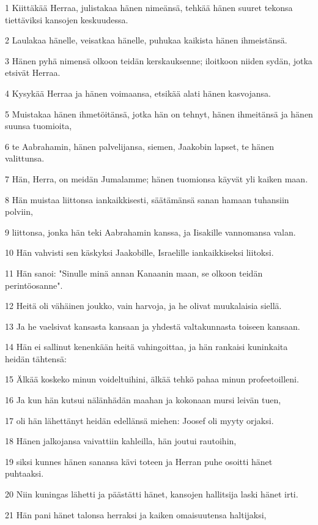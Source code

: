 \par 1 Kiittäkää Herraa, julistakaa hänen nimeänsä, tehkää hänen suuret tekonsa tiettäviksi kansojen keskuudessa.
\par 2 Laulakaa hänelle, veisatkaa hänelle, puhukaa kaikista hänen ihmeistänsä.
\par 3 Hänen pyhä nimensä olkoon teidän kerskauksenne; iloitkoon niiden sydän, jotka etsivät Herraa.
\par 4 Kysykää Herraa ja hänen voimaansa, etsikää alati hänen kasvojansa.
\par 5 Muistakaa hänen ihmetöitänsä, jotka hän on tehnyt, hänen ihmeitänsä ja hänen suunsa tuomioita,
\par 6 te Aabrahamin, hänen palvelijansa, siemen, Jaakobin lapset, te hänen valittunsa.
\par 7 Hän, Herra, on meidän Jumalamme; hänen tuomionsa käyvät yli kaiken maan.
\par 8 Hän muistaa liittonsa iankaikkisesti, säätämänsä sanan hamaan tuhansiin polviin,
\par 9 liittonsa, jonka hän teki Aabrahamin kanssa, ja Iisakille vannomansa valan.
\par 10 Hän vahvisti sen käskyksi Jaakobille, Israelille iankaikkiseksi liitoksi.
\par 11 Hän sanoi: "Sinulle minä annan Kanaanin maan, se olkoon teidän perintöosanne".
\par 12 Heitä oli vähäinen joukko, vain harvoja, ja he olivat muukalaisia siellä.
\par 13 Ja he vaelsivat kansasta kansaan ja yhdestä valtakunnasta toiseen kansaan.
\par 14 Hän ei sallinut kenenkään heitä vahingoittaa, ja hän rankaisi kuninkaita heidän tähtensä:
\par 15 Älkää koskeko minun voideltuihini, älkää tehkö pahaa minun profeetoilleni.
\par 16 Ja kun hän kutsui nälänhädän maahan ja kokonaan mursi leivän tuen,
\par 17 oli hän lähettänyt heidän edellänsä miehen: Joosef oli myyty orjaksi.
\par 18 Hänen jalkojansa vaivattiin kahleilla, hän joutui rautoihin,
\par 19 siksi kunnes hänen sanansa kävi toteen ja Herran puhe osoitti hänet puhtaaksi.
\par 20 Niin kuningas lähetti ja päästätti hänet, kansojen hallitsija laski hänet irti.
\par 21 Hän pani hänet talonsa herraksi ja kaiken omaisuutensa haltijaksi,
